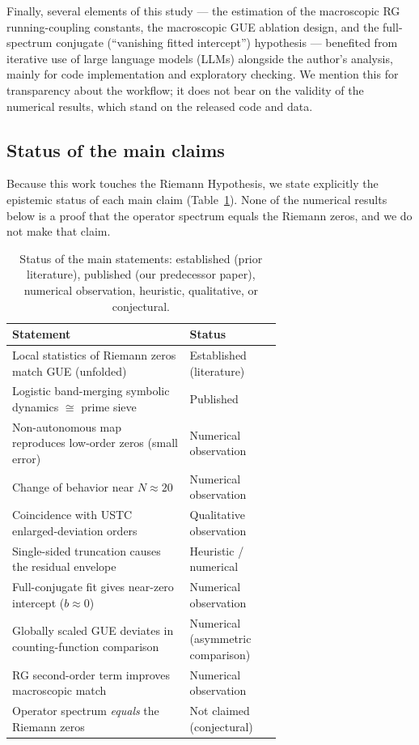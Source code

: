 \documentclass[fleqn,10pt]{wlscirep}
\begin{document}
Finally, several elements of this study --- the estimation of the
macroscopic RG running-coupling constants, the macroscopic GUE ablation
design, and the full-spectrum conjugate (``vanishing fitted intercept'')
hypothesis --- benefited from iterative use of large language models
(LLMs) alongside the author's analysis, mainly for code implementation
and exploratory checking. We mention this for transparency about the
workflow; it does not bear on the validity of the numerical results,
which stand on the released code and data.

\subsection*{Status of the main claims}

Because this work touches the Riemann Hypothesis, we state explicitly the
epistemic status of each main claim (Table~\ref{tab:claims}). None of the
numerical results below is a proof that the operator spectrum equals the
Riemann zeros, and we do not make that claim.

\begin{table}[ht]
\centering
\begin{tabular}{p{0.66\linewidth}l}
\hline
Statement & Status \\
\hline
Local statistics of Riemann zeros match GUE (unfolded) & Established (literature) \\
Logistic band-merging symbolic dynamics $\cong$ prime sieve & Published \cite{wang2026} \\
Non-autonomous map reproduces low-order zeros (small error) & Numerical observation \\
Change of behavior near $N\approx20$ & Numerical observation \\
Coincidence with USTC enlarged-deviation orders & Qualitative observation \\
Single-sided truncation causes the residual envelope & Heuristic / numerical \\
Full-conjugate fit gives near-zero intercept ($b\approx0$) & Numerical observation \\
Globally scaled GUE deviates in counting-function comparison & Numerical (asymmetric comparison) \\
RG second-order term improves macroscopic match & Numerical observation \\
Operator spectrum \emph{equals} the Riemann zeros & Not claimed (conjectural) \\
\hline
\end{tabular}
\caption{\label{tab:claims}Status of the main statements: established (prior literature), published (our predecessor paper), numerical observation, heuristic, qualitative, or conjectural.}
\end{table}
\end{document}
